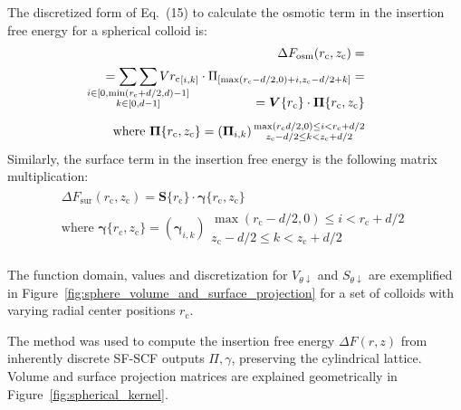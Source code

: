 \documentclass[10pt, a4paper, twocolumn]{article}
\begin{document}
The discretized form of Eq.~(15) to calculate the osmotic term in the insertion free energy for a spherical colloid is:
\begin{eqnarray}
    \begin{aligned}
        \Delta F_{\text{osm}}(r_{\text{c}}, z_{\text{c}}) =\\
        = \mathop{\sum\sum}_{\mathclap{\substack{i \in [0, \min(r_{\text{c}}+d/2,d)-1] \\ k \in [0, d-1]}}} V{r_{\text{c}}}_{[i, k]} \cdot \Pi_{[\max(r_{\text{c}}-d/2,0)+i, z_{\text{c}}-d/2+k]} =\\[-15pt]
        = \bm{V}\{r_{\text{c}}\} \cdot \bm{\Pi}\{r_{\text{c}}, z_{\text{c}}\} \\[5pt]
        \text{where } \bm{\Pi}\{r_{\text{c}},z_{\text{c}}\} =\left(\bm{\Pi}_{i,k}\right) {\substack{\max(r_{\text{c}}d/2,0) \le i < r_{\text{c}}+d/2 \\ z_{\text{c}}-d/2 \le k < z_{\text{c}}+d/2}}
    \end{aligned}
\end{eqnarray}
Similarly, the surface term in the insertion free energy is the following matrix multiplication:
\begin{eqnarray}
    \begin{aligned}
        \Delta F_{\text{sur}}(r_{\text{c}}, z_{\text{c}}) = \bm{S}\{r_{\text{c}}\} \cdot \bm{\gamma}\{r_{\text{c}}, z_{\text{c}}\} \\[5pt]
        \text{where } \bm{\gamma}\{r_{\text{c}},z_{\text{c}}\} =\left(\bm{\gamma}_{i,k}\right) {\substack{\max(r_{\text{c}}-d/2,0) \le i < r_{\text{c}}+d/2 \\ z_{\text{c}}-d/2 \le k < z_{\text{c}}+d/2}}
    \end{aligned}
\end{eqnarray}

The function domain, values and discretization for $V_{\theta \downarrow}$ and $S_{\theta \downarrow}$ are exemplified in Figure~\ref{fig:sphere_volume_and_surface_projection} for a set of colloids with varying radial center positions $r_{\text{c}}$.

The method was used to compute the insertion free energy $\Delta F(r,z)$ from inherently discrete SF-SCF outputs $\Pi, \gamma$, preserving the cylindrical lattice.
Volume and surface projection matrices are explained geometrically in Figure~\ref{fig:spherical_kernel}.
\end{document}
